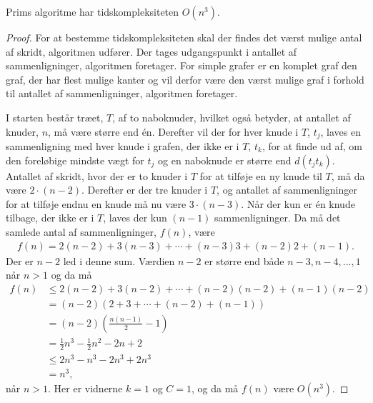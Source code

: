 \begin{thm}
	Prims algoritme har tidskompleksiteten $O (n^3)$.
	\label{prim_kompl}
\end{thm}
\begin{proof}
	For at bestemme tidskompleksiteten skal der findes det værst mulige antal af skridt, algoritmen udfører.
	Der tages udgangspunkt i antallet af sammenligninger, algoritmen foretager.
	For simple grafer er en komplet graf den graf, der har flest mulige kanter og vil derfor være den værst mulige graf i forhold til antallet af sammenligninger, algoritmen foretager.

	I starten består træet, $T$, af to naboknuder, hvilket også betyder, at antallet af knuder, $n$, må være større end én.
	Derefter vil der for hver knude i $T$, $t_j$, laves en sammenligning med hver knude i grafen, der ikke er i $T$, $t_k$, for at finde ud af, om den foreløbige mindste vægt for $t_j$ og en naboknude er større end $d(t_j t_k)$.
	Antallet af skridt, hvor der er to knuder i $T$ for at tilføje en ny knude til $T$, må da være $2 \cdot (n - 2)$.
	Derefter er der tre knuder i $T$, og antallet af sammenligninger for at tilføje endnu en knude må nu være $3 \cdot (n - 3)$.
	Når der kun er én knude tilbage, der ikke er i $T$, laves der kun $(n-1)$ sammenligninger.
	Da må det samlede antal af sammenligninger, $f(n)$, være
	\begin{align*}
		f(n) = 2 (n-2) + 3(n-3) + \dotsb + (n-3) 3 + (n-2) 2 + (n -1).
	\end{align*}
	Der er $n -2$ led i denne sum. Værdien $n-2$ er større end både $n-3, n-4, ..., 1$ når $n > 1$ og da må
	\begin{align*}
		f(n)
		&\leq 2 (n-2) + 3 (n-2) + \dotsb + (n-2) (n-2) + (n-1) (n-2) \\
		&= (n-2) \left( 2 + 3 + \dotsb + (n-2) + (n-1) \right) \\
		&= (n-2) \left( \frac{n(n-1)}{2} - 1 \right) \\
		&= \frac{1}{2} n^3 - \frac{1}{2} n^2 - 2n + 2 \\
		&\leq 2n^3 - n^3 - 2n^3 + 2n^3 \\
		&= n^3,
	\end{align*}
	når $n > 1$. Her er vidnerne $k=1$ og $C=1$, og da må $f(n)$ være $O(n^3)$.
\end{proof}
